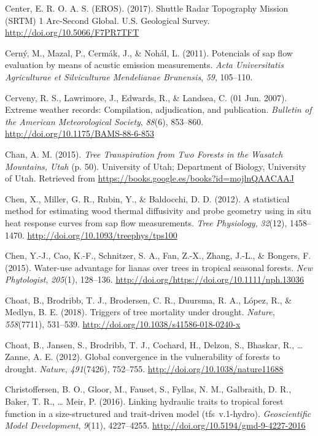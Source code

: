 \documentclass[11pt,twoside]{reedthesis}
\begin{document}
\hypertarget{ref-earth_resources_observation_and_science_eros_center_shuttle_2017}{}
Center, E. R. O. A. S. (EROS). (2017). Shuttle Radar Topography Mission
(SRTM) 1 Arc-Second Global. U.S. Geological Survey.
\url{http://doi.org/10.5066/F7PR7TFT}

\hypertarget{ref-Cern2011}{}
Cerný, M., Mazal, P., Cermák, J., \& Nohál, L. (2011). Potencials of sap
flow evaluation by means of acustic emission measurements. \emph{Acta
Universitatis Agriculturae et Silviculturae Mendelianae Brunensis},
\emph{59}, 105--110.

\hypertarget{ref-Cerveny2007}{}
Cerveny, R. S., Lawrimore, J., Edwards, R., \& Landsea, C. (01 Jun.
2007). Extreme weather records: Compilation, adjudication, and
publication. \emph{Bulletin of the American Meteorological Society},
\emph{88}(6), 853--860. \url{http://doi.org/10.1175/BAMS-88-6-853}

\hypertarget{ref-Chan2015}{}
Chan, A. M. (2015). \emph{Tree Transpiration from Two Forests in the
Wasatch Mountains, Utah} (p. 50). University of Utah; Department of
Biology, University of Utah. Retrieved from
\url{https://books.google.es/books?id=mojlnQAACAAJ}

\hypertarget{ref-Chen2012}{}
Chen, X., Miller, G. R., Rubin, Y., \& Baldocchi, D. D. (2012). A
statistical method for estimating wood thermal diffusivity and probe
geometry using in situ heat response curves from sap flow measurements.
\emph{Tree Physiology}, \emph{32}(12), 1458--1470.
\url{http://doi.org/10.1093/treephys/tps100}

\hypertarget{ref-Chen2015}{}
Chen, Y.-J., Cao, K.-F., Schnitzer, S. A., Fan, Z.-X., Zhang, J.-L., \&
Bongers, F. (2015). Water-use advantage for lianas over trees in
tropical seasonal forests. \emph{New Phytologist}, \emph{205}(1),
128--136. \url{http://doi.org/https://doi.org/10.1111/nph.13036}

\hypertarget{ref-choat_triggers_2018}{}
Choat, B., Brodribb, T. J., Brodersen, C. R., Duursma, R. A., López, R.,
\& Medlyn, B. E. (2018). Triggers of tree mortality under drought.
\emph{Nature}, \emph{558}(7711), 531--539.
\url{http://doi.org/10.1038/s41586-018-0240-x}

\hypertarget{ref-choat_global_2012}{}
Choat, B., Jansen, S., Brodribb, T. J., Cochard, H., Delzon, S.,
Bhaskar, R., \ldots{} Zanne, A. E. (2012). Global convergence in the
vulnerability of forests to drought. \emph{Nature}, \emph{491}(7426),
752--755. \url{http://doi.org/10.1038/nature11688}

\hypertarget{ref-Christoffersen2016}{}
Christoffersen, B. O., Gloor, M., Fauset, S., Fyllas, N. M., Galbraith,
D. R., Baker, T. R., \ldots{} Meir, P. (2016). Linking hydraulic traits
to tropical forest function in a size-structured and trait-driven model
(tfs~v.1-hydro). \emph{Geoscientific Model Development}, \emph{9}(11),
4227--4255. \url{http://doi.org/10.5194/gmd-9-4227-2016}
\end{document}
